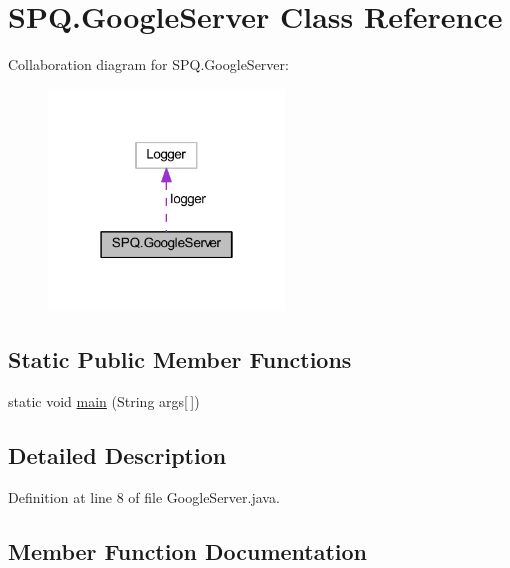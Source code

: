 \hypertarget{class_s_p_q_1_1_google_server}{}\section{S\+P\+Q.\+Google\+Server Class Reference}
\label{class_s_p_q_1_1_google_server}


Collaboration diagram for S\+P\+Q.\+Google\+Server\+:\nopagebreak
\begin{figure}[H]
\begin{center}
\leavevmode
\includegraphics[width=178pt]{class_s_p_q_1_1_google_server__coll__graph}
\end{center}
\end{figure}
\subsection*{Static Public Member Functions}
\begin{DoxyCompactItemize}
\item 
static void \mbox{\hyperlink{class_s_p_q_1_1_google_server_a274b82865fbf2ccda7ddafe6ae442b15}{main}} (String args\mbox{[}$\,$\mbox{]})
\end{DoxyCompactItemize}


\subsection{Detailed Description}


Definition at line 8 of file Google\+Server.\+java.



\subsection{Member Function Documentation}
\mbox{\label{class_s_p_q_1_1_google_server_a274b82865fbf2ccda7ddafe6ae442b15}} 
